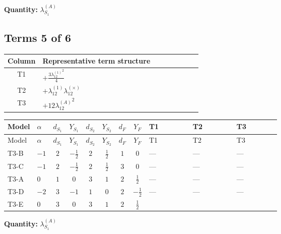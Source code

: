 \documentclass[8pt]{article}
\begin{document}
\begin{landscape}
\begin{longtable}{@{}llcccccc >{\raggedright\arraybackslash}p{0.21\linewidth} >{\raggedright\arraybackslash}p{0.21\linewidth} >{\raggedright\arraybackslash}p{0.21\linewidth}@{}}
\midrule
\bottomrule
\end{longtable}
\clearpage
\noindent\textbf{Quantity: }$\lambda_{S_1}^{(A)}$\par\smallskip
\subsection*{Terms 5 of 6}
\begin{center}
\begin{tabular}{@{}c >{\raggedright\arraybackslash}p{0.82\linewidth}@{}}
\toprule
Column & Representative term structure \\
\midrule
T1 & \(\displaystyle +\frac{3 {\lambda_{12}^{(1)}}^2}{4}\) \\
\midrule
T2 & \(\displaystyle +{\lambda_{12}^{(1)}} {\lambda_{12}^{(\times)}}\) \\
\midrule
T3 & \(\displaystyle +12 {\lambda_{12}^{(A)}}^2\) \\
\midrule
\bottomrule
\end{tabular}
\end{center}
\smallskip
\tiny
\begin{longtable}{@{}llcccccc >{\raggedright\arraybackslash}p{0.21\linewidth} >{\raggedright\arraybackslash}p{0.21\linewidth} >{\raggedright\arraybackslash}p{0.21\linewidth}@{}}
\toprule
Model & $\alpha$ & $d_{S_1}$ & $Y_{S_1}$ & $d_{S_2}$ & $Y_{S_2}$ & $d_F$ & $Y_F$ & T1 & T2 & T3 \\
\midrule
\endfirsthead
\toprule
Model & $\alpha$ & $d_{S_1}$ & $Y_{S_1}$ & $d_{S_2}$ & $Y_{S_2}$ & $d_F$ & $Y_F$ & T1 & T2 & T3 \\
\midrule
\endhead
T3-B & $-1$ & $2$ & $-\frac{1}{2}$ & $2$ & $\frac{1}{2}$ & $1$ & $0$ & --- & --- & --- \\
\midrule
T3-C & $-1$ & $2$ & $-\frac{1}{2}$ & $2$ & $\frac{1}{2}$ & $3$ & $0$ & --- & --- & --- \\
\midrule
T3-A & $0$ & $1$ & $0$ & $3$ & $1$ & $2$ & $\frac{1}{2}$ & --- & --- & --- \\
\midrule
T3-D & $-2$ & $3$ & $-1$ & $1$ & $0$ & $2$ & $-\frac{1}{2}$ & --- & --- & --- \\
\midrule
T3-E & $0$ & $3$ & $0$ & $3$ & $1$ & $2$ & $\frac{1}{2}$ & \scriptsize\adjustbox{max width=\linewidth}{$\begin{gathered} +\frac{3 {\lambda_{12}^{(1)}}^2}{4}\end{gathered}$} & \scriptsize\adjustbox{max width=\linewidth}{$\begin{gathered} +{\lambda_{12}^{(1)}} {\lambda_{12}^{(\times)}}\end{gathered}$} & \scriptsize\adjustbox{max width=\linewidth}{$\begin{gathered} +12 {\lambda_{12}^{(A)}}^2\end{gathered}$} \\
\midrule
\bottomrule
\end{longtable}
\clearpage
\noindent\textbf{Quantity: }$\lambda_{S_1}^{(A)}$\par\smallskip

\end{landscape}
\end{document}
